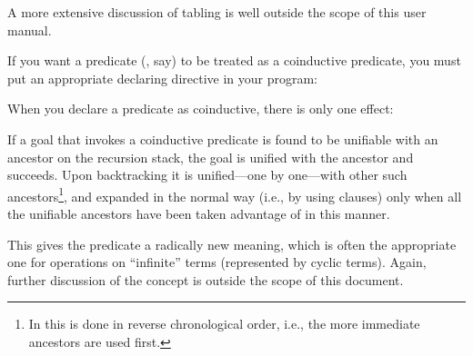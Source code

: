 A more extensive discussion of tabling is well outside the scope of this user
manual.



%
%

If you want a predicate (, say) to be treated as a coinductive
predicate, you must put an appropriate declaring directive in your
program:\\
\ind{}

When you declare a predicate as coinductive, there is only one effect:
\begin{Itemize}
  \item
    If a goal that invokes a coinductive predicate is found to be unifiable
    with an ancestor on the recursion stack, the goal is unified with the
    ancestor and succeeds.  Upon backtracking it is unified---one by
    one---with other such ancestors\footnote{
      In  this is done in reverse chronological order, i.e.,
      the more immediate ancestors are used first.
    }, and expanded in the normal way (i.e., by
    using clauses) only when all the unifiable ancestors have been taken
    advantage of in this manner.
\end{Itemize}
This gives the predicate a radically new meaning, which is often the
appropriate one for operations on ``infinite'' terms (represented by cyclic
terms).  Again, further discussion of the concept is outside the scope of
this document.
